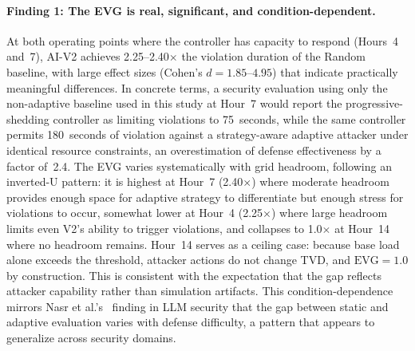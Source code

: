 \paragraph{Finding 1: The EVG is real, significant, and condition-dependent.}
At both operating points where the controller has capacity to respond (Hours~4 and~7), AI-V2 achieves 2.25--2.40$\times$ the violation duration of the Random baseline, with large effect sizes (Cohen's $d = 1.85$--$4.95$) that indicate practically meaningful differences.
In concrete terms, a security evaluation using only the non-adaptive baseline used in this study at Hour~7 would report the progressive-shedding controller as limiting violations to 75~seconds, while the same controller permits 180~seconds of violation against a strategy-aware adaptive attacker under identical resource constraints, an overestimation of defense effectiveness by a factor of~2.4.
The EVG varies systematically with grid headroom, following an inverted-U pattern: it is highest at Hour~7 (2.40$\times$) where moderate headroom provides enough space for adaptive strategy to differentiate but enough stress for violations to occur, somewhat lower at Hour~4 (2.25$\times$) where large headroom limits even V2's ability to trigger violations, and collapses to 1.0$\times$ at Hour~14 where no headroom remains.
Hour~14 serves as a ceiling case: because base load alone exceeds the threshold, attacker actions do not change TVD, and $\text{EVG} = 1.0$ by construction. This is consistent with the expectation that the gap reflects attacker capability rather than simulation artifacts.
This condition-dependence mirrors Nasr et al.'s~\cite{nasr2025attacker} finding in LLM security that the gap between static and adaptive evaluation varies with defense difficulty, a pattern that appears to generalize across security domains.

